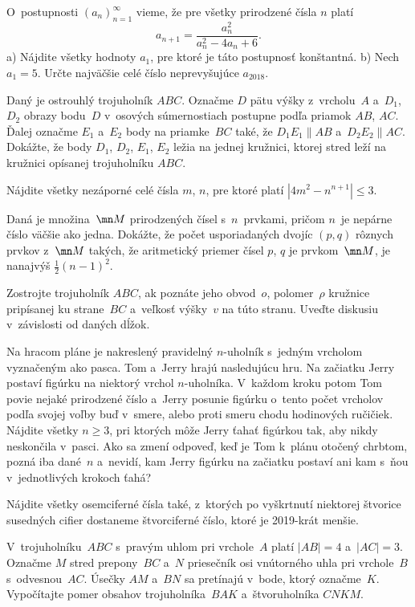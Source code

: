 ﻿{%
O~postupnosti $(a_n)_{n=1}^{\infty}$ vieme, že pre
všetky prirodzené čísla $n$ platí
$$
a_{n+1}=\frac{a_n^2}{a_n^2-4a_n+6}.
$$
\ite a)
Nájdite všetky hodnoty $a_1$, pre ktoré je táto postupnosť
konštantná.
\ite b)
Nech $a_1=5$. Určte najväčšie celé číslo neprevyšujúce $a_{2018}$.}

{%
Daný je ostrouhlý trojuholník $ABC$. Označme $D$ pätu
výšky z~vrcholu~$A$ a~$D_1$,~$D_2$ obrazy bodu~$D$ v~osových
súmernostiach postupne podľa priamok $AB$, $AC$. Ďalej označme $E_1$ a~$E_2$ body
na priamke~$BC$ také, že $D_1E_1 \parallel AB$ a~$D_2E_2 \parallel AC$.
Dokážte, že body $D_1$, $D_2$, $E_1$, $E_2$ ležia na jednej kružnici,
ktorej stred leží na kružnici opísanej trojuholníku $ABC$.}

{%
Nájdite všetky nezáporné celé čísla $m$, $n$, pre ktoré platí
$|4m^2-n^{n+1}|\le 3$.}

{%
Daná je množina~$\mn M$ prirodzených čísel s~$n$~prvkami, pričom
$n$~je nepárne číslo väčšie ako jedna.
Dokážte, že počet usporiadaných dvojíc $(p,q)$ rôznych prvkov
z~$\mn M$ takých, že aritmetický priemer čísel $p$, $q$ je prvkom~$\mn M$, je nanajvýš
$\frac12(n-1)^2$.}

{%
Zostrojte trojuholník $ABC$, ak poznáte jeho obvod~$o$,
polomer~$\rho$ kružnice pripísanej ku strane~$BC$ a~veľkosť výšky~$v$ na túto
stranu. Uveďte diskusiu v~závislosti od daných dĺžok.}

{%
Na hracom pláne je nakreslený pravidelný $n$-uholník s~jedným
vrcholom vyznačeným ako pasca. Tom a~Jerry hrajú nasledujúcu hru.
Na začiatku Jerry postaví figúrku na niektorý vrchol $n$-uholníka.
V~každom kroku potom Tom povie nejaké prirodzené číslo a~Jerry
posunie figúrku o~tento počet vrcholov podľa svojej voľby buď v~smere, alebo proti smeru chodu hodinových ručičiek. Nájdite
všetky $n\ge3$, pri ktorých môže Jerry
ťahať figúrkou tak, aby nikdy neskončila v~pasci. Ako
sa zmení odpoveď, keď je Tom k~plánu otočený chrbtom, pozná iba dané~$n$
a~nevidí, kam Jerry figúrku na začiatku postaví ani kam s~ňou
v~jednotlivých krokoch ťahá?}

{%
Nájdite všetky osemciferné čísla také, z~ktorých po vyškrtnutí niektorej
štvorice susedných cifier dostaneme štvorciferné číslo,
ktoré je 2019-krát menšie.}

{%
V~trojuholníku~$ABC$ s~pravým uhlom pri vrchole~$A$ platí $|AB|=4$
a~${|AC|=3}$. Označme $M$ stred prepony~$BC$ a~$N$ priesečník osi
vnútorného uhla pri vrchole~$B$ s~odvesnou~$AC$. Úsečky $AM$ a~$BN$
sa pretínajú v~bode, ktorý označme~$K$. Vypočítajte pomer obsahov
trojuholníka~$BAK$ a~štvoruholníka $CNKM$.}

